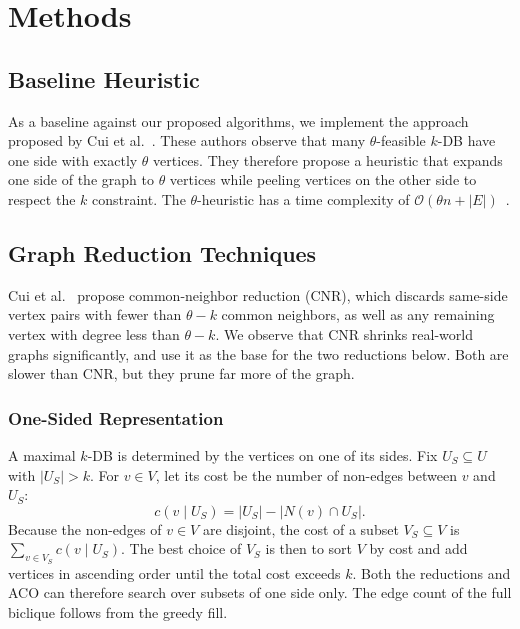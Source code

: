 \documentclass[conference]{IEEEtran}
\begin{document}
\section{Methods}

\subsection{Baseline Heuristic}

As a baseline against our proposed algorithms, we implement the approach proposed by Cui et al.~\cite{cui}. These authors observe that many $\theta$-feasible $k$-DB have one side with exactly $\theta$ vertices. They therefore propose a heuristic that expands one side of the graph to $\theta$ vertices while peeling vertices on the other side to respect the $k$ constraint. The $\theta$-heuristic has a time complexity of $\mathcal{O}(\theta n + |E|)$~\cite{cui}.

\FloatBarrier

\subsection{Graph Reduction Techniques}

Cui et al.~\cite{cui} propose common-neighbor reduction (CNR), which discards same-side vertex pairs with fewer than $\theta - k$ common neighbors, as well as any remaining vertex with degree less than $\theta - k$. We observe that CNR shrinks real-world graphs significantly, and use it as the base for the two reductions below. Both are slower than CNR, but they prune far more of the graph.


\subsubsection{One-Sided Representation}

A maximal $k$-DB is determined by the vertices on one of its sides. Fix $U_S \subseteq U$ with $|U_S| > k$. For $v \in V$, let its cost be the number of non-edges between $v$ and $U_S$:
\[
c(v \mid U_S) = |U_S| - |N(v) \cap U_S|.
\]
Because the non-edges of $v \in V$ are disjoint, the cost of a subset $V_S \subseteq V$ is $\sum_{v \in V_S}c(v \mid U_S)$. The best choice of $V_S$ is then to sort $V$ by cost and add vertices in ascending order until the total cost exceeds $k$. Both the reductions and ACO can therefore search over subsets of one side only. The edge count of the full biclique follows from the greedy fill.
\end{document}
